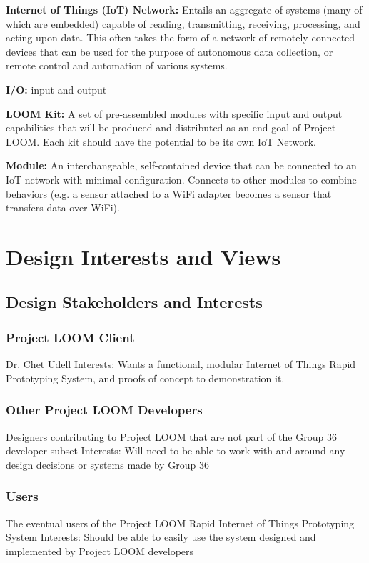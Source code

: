 \documentclass[onecolumn, draftclsnofoot,10pt, compsoc]{IEEEtran}
\begin{document}
    \textbf{Internet of Things (IoT) Network:} Entails an aggregate of systems (many of which are embedded) capable of reading, transmitting, receiving, processing, and acting upon data. This often takes the form of a network of remotely connected devices that can be used for the purpose of autonomous data collection, or remote control and automation of various systems.

    \textbf{I/O:} input and output

    \textbf{LOOM Kit:} A set of pre-assembled modules with specific input and output capabilities that will be produced and distributed as an end goal of Project LOOM. Each kit should have the potential to be its own IoT Network. 

    \textbf{Module:} An interchangeable, self-contained device that can be connected to an IoT network with minimal configuration. Connects to other modules to combine behaviors (e.g. a sensor attached to a WiFi adapter becomes a sensor that transfers data over WiFi).





\section{Design Interests and Views}
\subsection{Design Stakeholders and Interests}

\subsubsection{Project LOOM Client}
    Dr. Chet Udell
    Interests: Wants a functional, modular Internet of Things Rapid Prototyping System, and proofs of concept to demonstration it.

\subsubsection{Other Project LOOM Developers}
    Designers contributing to Project LOOM that are not part of the Group 36 developer subset
    Interests: Will need to be able to work with and around any design decisions or systems made by Group 36

\subsubsection{Users}
    The eventual users of the Project LOOM Rapid Internet of Things Prototyping System
    Interests: Should be able to easily use the system designed and implemented by Project LOOM developers
\end{document}

